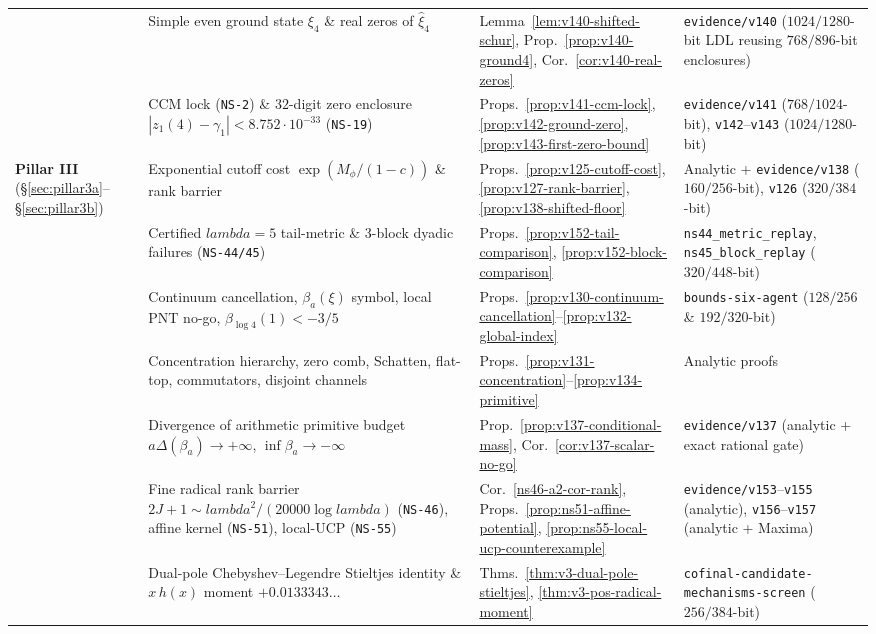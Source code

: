 \documentclass[11pt]{article}
\def\lambda{lambda}%
\theoremstyle{remark}
\begin{document}
\begin{table}[htbp]
\begin{tabular}{>{\raggedright\arraybackslash}p{2.0cm}>{\raggedright\arraybackslash}p{5.2cm}>{\raggedright\arraybackslash}p{3.4cm}>{\raggedright\arraybackslash}p{3.9cm}}
 & Simple even ground state $\xi_4$ \& real zeros of $\widehat{\xi}_4$ & Lemma~\ref{lem:v140-shifted-schur}, Prop.~\ref{prop:v140-ground4}, Cor.~\ref{cor:v140-real-zeros} & \texttt{evidence/v140} ($1024/1280$-bit LDL reusing $768/896$-bit enclosures) \\
 & CCM lock (\texttt{NS-2}) \& $32$-digit zero enclosure $|z_1(4)-\gamma_1|<8.752\cdot 10^{-33}$ (\texttt{NS-19}) & Props.~\ref{prop:v141-ccm-lock}, \ref{prop:v142-ground-zero}, \ref{prop:v143-first-zero-bound} & \texttt{evidence/v141} ($768/1024$-bit), \texttt{v142}--\texttt{v143} ($1024/1280$-bit) \\
\midrule
\textbf{Pillar III} (\S\ref{sec:pillar3a}--\S\ref{sec:pillar3b}) & Exponential cutoff cost $\exp(M_\phi/(1-c))$ \& rank barrier & Props.~\ref{prop:v125-cutoff-cost}, \ref{prop:v127-rank-barrier}, \ref{prop:v138-shifted-floor} & Analytic + \texttt{evidence/v138} ($160/256$-bit), \texttt{v126} ($320/384$-bit) \\
 & Certified $\lambda=5$ tail-metric \& 3-block dyadic failures (\texttt{NS-44/45}) & Props.~\ref{prop:v152-tail-comparison}, \ref{prop:v152-block-comparison} & \texttt{ns44\_metric\_replay}, \texttt{ns45\_block\_replay} ($320/448$-bit) \\
 & Continuum cancellation, $\beta_a(\xi)$ symbol, local PNT no-go, $\beta_{\log 4}(1)<-3/5$ & Props.~\ref{prop:v130-continuum-cancellation}--\ref{prop:v132-global-index} & \texttt{bounds-six-agent} ($128/256$ \& $192/320$-bit) \\
 & Concentration hierarchy, zero comb, Schatten, flat-top, commutators, disjoint channels & Props.~\ref{prop:v131-concentration}--\ref{prop:v134-primitive} & Analytic proofs \\
 & Divergence of arithmetic primitive budget $a\Delta(\beta_a)\to+\infty$, $\inf\beta_a\to-\infty$ & Prop.~\ref{prop:v137-conditional-mass}, Cor.~\ref{cor:v137-scalar-no-go} & \texttt{evidence/v137} (analytic + exact rational gate) \\
 & Fine radical rank barrier $2J+1\sim\lambda^2/(20000\log\lambda)$ (\texttt{NS-46}), affine kernel (\texttt{NS-51}), local-UCP (\texttt{NS-55}) & Cor.~\ref{ns46-a2-cor-rank}, Props.~\ref{prop:ns51-affine-potential}, \ref{prop:ns55-local-ucp-counterexample} & \texttt{evidence/v153}--\texttt{v155} (analytic), \texttt{v156}--\texttt{v157} (analytic + Maxima) \\
 & Dual-pole Chebyshev--Legendre Stieltjes identity \& $x\,h(x)$ moment $+0.0133343\dots$ & Thms.~\ref{thm:v3-dual-pole-stieltjes}, \ref{thm:v3-pos-radical-moment} & \texttt{cofinal-\allowbreak candidate-\allowbreak mechanisms-\allowbreak screen} ($256/384$-bit) \\

\end{tabular}
\end{table}
\end{document}
